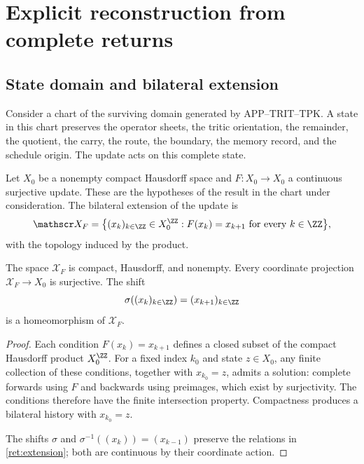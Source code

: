 \section{Explicit reconstruction from complete returns}
\label{ret:seccion}

\subsection{State domain and bilateral extension}

Consider a chart of the surviving domain generated by
APP--TRIT--TPK. A state in this chart preserves the operator sheets,
the tritic orientation, the remainder, the quotient, the carry, the route,
the boundary, the memory record, and the schedule origin.
The update acts on this complete state.

Let \(X_0\) be a nonempty compact Hausdorff space and
\(F:X_0\to X_0\) a continuous surjective update.
These are the hypotheses of the result in the chart under consideration.
The bilateral extension of the update is
\begin{equation}
 \mathscr X_F=
 \bigl\{(x_k)_{k\in\ZZ}\in X_0^{\ZZ}:
                  F(x_k)=x_{k+1}\text{ for every }k\in\ZZ\bigr\},
 \label{ret:extension}
\end{equation}
with the topology induced by the product.

\begin{lemma}
\label{ret:existencia}
The space \(\mathscr X_F\) is compact, Hausdorff, and nonempty.
Every coordinate projection \(\mathscr X_F\to X_0\) is surjective.
The shift
\[
 \sigma((x_k)_{k\in\ZZ})=(x_{k+1})_{k\in\ZZ}
\]
is a homeomorphism of \(\mathscr X_F\).
\end{lemma}
\begin{proof}
Each condition \(F(x_k)=x_{k+1}\) defines a closed subset of the compact
Hausdorff product \(X_0^{\ZZ}\).
For a fixed index \(k_0\) and state \(z\in X_0\), any finite
collection of these conditions, together with \(x_{k_0}=z\), admits a solution:
complete forwards using \(F\) and backwards using
preimages, which exist by surjectivity. The conditions therefore have
the finite intersection property. Compactness produces
a bilateral history with \(x_{k_0}=z\).

The shifts \(\sigma\) and
\(\sigma^{-1}((x_k))=(x_{k-1})\) preserve the relations in
\eqref{ret:extension}; both are continuous by their coordinate action.
\end{proof}

